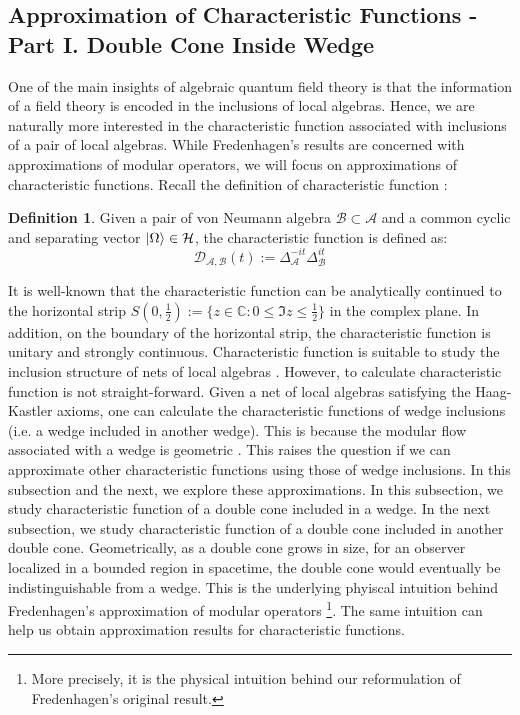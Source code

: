 \documentclass[a4paper,11pt]{article}
\theoremstyle{definition}
\newtheorem{definition}{Definition}[section]
\begin{document}
\subsection{Approximation of Characteristic Functions - Part I. Double Cone Inside Wedge}\label{subsection:coneinsidewedge}
One of the main insights of algebraic quantum field theory is that the information of a field theory is encoded in the inclusions of local algebras. Hence, we are naturally more interested in the characteristic function associated with inclusions of a pair of local algebras. While Fredenhagen's results \cite{fredenhagen} are concerned with approximations of modular operators, we will focus on approximations of characteristic functions. Recall the definition of characteristic function \cite{revolutionizing}:
\begin{definition}
    Given a pair of von Neumann algebra $\mathcal{B}\subset\mathcal{A}$ and a common cyclic and separating vector $\ket{\Omega}\in\mathcal{H}$, the characteristic function is defined as:
    \begin{equation}
        \mathcal{D}_{\mathcal{A},\mathcal{B}}(t) := \Delta_\mathcal{A}^{-it}\Delta_\mathcal{B}^{it}
    \end{equation}
\end{definition}
It is well-known that the characteristic function can be analytically continued to the horizontal strip $S(0, \frac{1}{2}) := \{z\in\mathbb{C}:0\leq \Im{z} \leq \frac{1}{2}\}$ in the complex plane. In addition, on the boundary of the horizontal strip, the characteristic function is unitary and strongly continuous. Characteristic function is suitable to study the inclusion structure of nets of local algebras \cite{revolutionizing}. However, to calculate characteristic function is not straight-forward. Given a net of local algebras satisfying the Haag-Kastler axioms, one can calculate the characteristic functions of wedge inclusions (i.e. a wedge included in another wedge). This is because the modular flow associated with a wedge is geometric \cite{bisognanowichmann}. This raises the question if we can approximate other characteristic functions using those of wedge inclusions. In this subsection and the next, we explore these approximations. In this subsection, we study characteristic function of a double cone included in a wedge. In the next subsection, we study characteristic function of a double cone included in another double cone. Geometrically, as a double cone grows in size, for an observer localized in a bounded region in spacetime, the double cone would eventually be indistinguishable from a wedge. This is the underlying phyiscal intuition behind Fredenhagen's approximation of modular operators \cite{fredenhagen}\footnote{More precisely, it is the physical intuition behind our reformulation of Fredenhagen's original result.}. The same intuition can help us obtain approximation results for characteristic functions.
\end{document}
